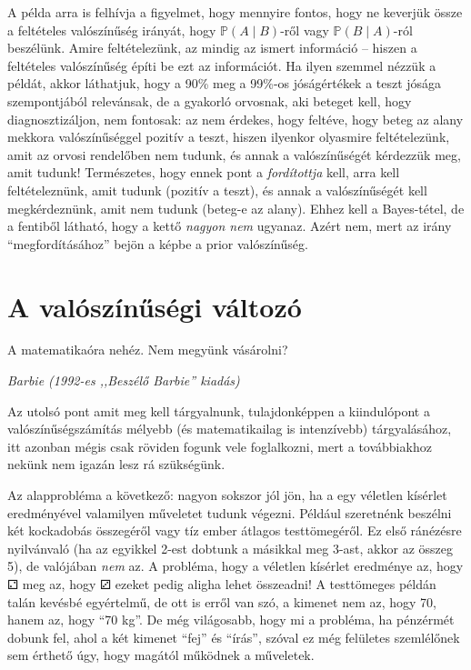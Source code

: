 \documentclass[magyar,]{book}
\begin{document}
A példa arra is felhívja a figyelmet, hogy mennyire fontos, hogy ne keverjük össze a feltételes valószínűség irányát, hogy \(\mathbb{P}\left(A \mid B\right)\)-ről vagy \(\mathbb{P}\left(B \mid A\right)\)-ról beszélünk. Amire feltételezünk, az mindig az ismert információ -- hiszen a feltételes valószínűség építi be ezt az információt. Ha ilyen szemmel nézzük a példát, akkor láthatjuk, hogy a 90\% meg a 99\%-os jóságértékek a teszt jósága szempontjából relevánsak, de a gyakorló orvosnak, aki beteget kell, hogy diagnosztizáljon, nem fontosak: az nem érdekes, hogy feltéve, hogy beteg az alany mekkora valószínűséggel pozitív a teszt, hiszen ilyenkor olyasmire feltételezünk, amit az orvosi rendelőben nem tudunk, és annak a valószínűségét kérdezzük meg, amit tudunk! Természetes, hogy ennek pont a \emph{fordítottja} kell, arra kell feltételeznünk, amit tudunk (pozitív a teszt), és annak a valószínűségét kell megkérdeznünk, amit nem tudunk (beteg-e az alany). Ehhez kell a Bayes-tétel, de a fentiből látható, hogy a kettő \emph{nagyon nem} ugyanaz. Azért nem, mert az irány \enquote{megfordításához} bejön a képbe a prior valószínűség.

\hypertarget{a-valuxf3szuxednux171suxe9gi-vuxe1ltozuxf3}{%
\section{A valószínűségi változó}\label{a-valuxf3szuxednux171suxe9gi-vuxe1ltozuxf3}}

\epigraph{A matematikaóra nehéz. Nem megyünk vásárolni?}{\textit{Barbie (1992-es ,,Beszélő Barbie'' kiadás)}}

Az utolsó pont amit meg kell tárgyalnunk, tulajdonképpen a kiindulópont a valószínűségszámítás mélyebb (és matematikailag is intenzívebb) tárgyalásához, itt azonban mégis csak röviden fogunk vele foglalkozni, mert a továbbiakhoz nekünk nem igazán lesz rá szükségünk.

Az alapprobléma a következő: nagyon sokszor jól jön, ha a egy véletlen kísérlet eredményével valamilyen műveletet tudunk végezni. Például szeretnénk beszélni két kockadobás összegéről vagy tíz ember átlagos testtömegéről. Ez első ránézésre nyilvánvaló (ha az egyikkel 2-est dobtunk a másikkal meg 3-ast, akkor az összeg 5), de valójában \emph{nem} az. A probléma, hogy a véletlen kísérlet eredménye az, hogy ⚁ meg az, hogy ⚂ ezeket pedig aligha lehet összeadni! A testtömeges példán talán kevésbé egyértelmű, de ott is erről van szó, a kimenet nem az, hogy 70, hanem az, hogy \enquote{70 kg}. De még világosabb, hogy mi a probléma, ha pénzérmét dobunk fel, ahol a két kimenet \enquote{fej} és \enquote{írás}, szóval ez még felületes szemlélőnek sem érthető úgy, hogy magától működnek a műveletek.
\end{document}
